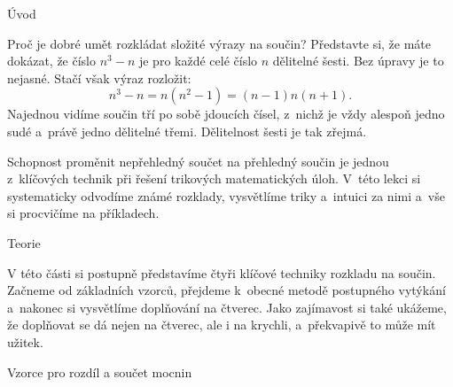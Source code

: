 





\sec Úvod

Proč je dobré umět rozkládat složité výrazy na součin? Představte si, že máte dokázat, že číslo $n^3-n$ je pro každé celé číslo $n$ dělitelné šesti. Bez úpravy je to nejasné. Stačí však výraz rozložit:
$$
n^3-n = n(n^2-1) = (n-1)n(n+1).
$$
Najednou vidíme součin tří po sobě jdoucích čísel, z~nichž je vždy alespoň jedno sudé a~právě jedno dělitelné třemi. Dělitelnost šesti je tak zřejmá.

Schopnost proměnit nepřehledný součet na přehledný součin je jednou z~klíčových technik při řešení trikových matematických úloh. V~této lekci si systematicky odvodíme známé rozklady, vysvětlíme triky a~intuici za nimi a~vše si procvičíme na příkladech.

\sec Teorie 

V této části si postupně představíme čtyři klíčové techniky rozkladu na součin. Začneme od základních vzorců, přejdeme k~obecné metodě postupného vytýkání a~nakonec si vysvětlíme doplňování na čtverec. Jako zajímavost si také ukážeme, že doplňovat se dá nejen na čtverec, ale i na krychli, a~překvapivě to může mít užitek.

\secc Vzorce pro rozdíl a součet mocnin



